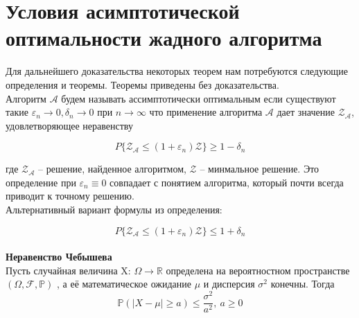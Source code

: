 \documentclass[a4paper, 14pt]{extarticle}
\numberwithin{equation}{section}
\begin{document}
\newcommand{\algorithm}{$\mathcal{A}$}
\newcommand{\topboundE}{$\mathcal{Z^*_{A}}$}
\newcommand{\topboundD}{$\mathcal{D^*_{A}}$}
\newcommand{\randomvalue}{$\mathcal{Z_{A}}$}
\newcommand{\randomvalueE}{$E(\text{\randomvalue})$}
\newcommand{\randomvalueD}{$D(\text{\randomvalue})$}

\section{Условия асимптотической оптимальности жадного алгоритма}

Для дальнейшего доказательства некоторых теорем нам потребуются следующие определения и теоремы. Теоремы приведены без доказательства.\\


Алгоритм $\mathcal{A}$ будем называть ассимптотически оптимальным если существуют такие $\varepsilon_n \rightarrow 0, \delta_n \rightarrow 0$ при $n \rightarrow \infty$ что применение алгоритма $\mathcal{A}$ дает значение  $\mathcal{Z_A}$, удовлетворяющее неравенству
 
\begin{equation}\label{1}
P\big\{\mathcal{Z_A} \leqslant (1+\varepsilon_n)\mathcal{Z}\big\}\geqslant 1-\delta_n
\end{equation}

\noindent где $\mathcal{Z_A}$ -- решение, найденное алгоритмом, $\mathcal{Z}$ -- минмальное решение.
Это определение при $\varepsilon_n \equiv 0$ совпадает с понятием алгоритма, который почти всегда приводит к точному решению. \\

Альтернативный вариант формулы из определения:

\begin{equation*}
P\{\mathcal{Z_A} \leqslant (1+\varepsilon_n)\mathcal{Z}\}\leqslant 1+\delta_n
\end{equation*} \\


\textbf{Неравенство Чебышева} \\

Пусть случайная величина X: $\Omega\rightarrow\mathbb {R}$ определена на вероятностном пространстве $(\Omega,{\mathcal {F}},\mathbb {P})$
, а её математическое ожидание $\mu$ и дисперсия  $\sigma ^{2}$ конечны. Тогда 
\begin{equation*}
{\mathbb {P}}\left(|X-\mu |\geqslant a\right)\leqslant {\frac {\sigma ^{2}}{a^{2}}}, \: a\geqslant 0
\end{equation*} \\ \\
\end{document}

